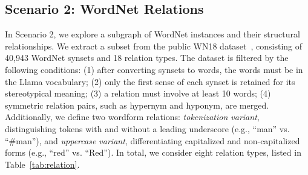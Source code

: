 \subsection{Scenario 2: WordNet Relations}
In Scenario 2, we explore a subgraph of WordNet instances and their structural relationships. We extract a subset from the public WN18 dataset~\cite{Bordes2013wn18}, consisting of 40,943 WordNet synsets and 18 relation types. The dataset is filtered by the following conditions: (1) after converting synsets to words, the words must be in the Llama vocabulary; (2) only the first sense of each synset is retained for its stereotypical meaning; (3) a relation must involve at least 10 words; (4) symmetric relation pairs, such as hypernym and hyponym, are merged. Additionally, we define two wordform relations: \textit{tokenization variant}, distinguishing tokens with and without a leading underscore (e.g., ``man'' vs. ``\#man''), and \textit{uppercase variant}, differentiating capitalized and non-capitalized forms (e.g., ``red'' vs. ``Red''). In total, we consider eight relation types, listed in Table~\ref{tab:relation}.


 
 




